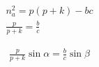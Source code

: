 \newpage
\section{
 }

\begin{figure}[h!]
	\centering
\end{figure}

\begin{gather}
	n_a^2         = p (p+k) - b c \\
	\frac{p}{p+k} = \frac{b}{c}
\end{gather}

\begin{figure}[h!]
	\centering
\end{figure}

\begin{gather}
	\frac{p}{p+k} \sin\alpha = \frac{b}{c} \sin\beta
\end{gather}
